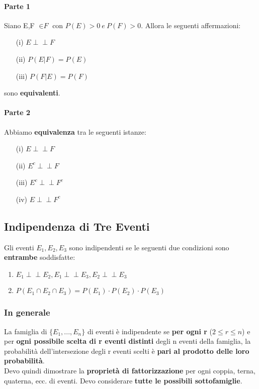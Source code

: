 \documentclass{report}
\newcommand{\indep}{\perp \!\!\! \perp}
\begin{document}
\paragraph{Parte 1}Siano E,F \(\in \textit{F}\) con \(P(E) > 0\ e\ P(F) > 0\). Allora le seguenti affermazioni:
    \begin{itemize}
        \item [(i)] \(E \indep F\)
        \item [(ii)] \(P(E|F) = P(E)\)
        \item [(iii)] \(P(F|E) = P(F)\)
    \end{itemize}
    sono \textbf{equivalenti}.
\paragraph{Parte 2}
Abbiamo \textbf{equivalenza} tra le seguenti istanze:
\begin{itemize}
    \item [(i)] \(E \indep F\)
    \item [(ii)] \(E^c \indep F\)
    \item [(iii)] \(E^c \indep F^c\)
    \item [(iv)] \(E \indep F^c\)
\end{itemize}
\subsection{Indipendenza di Tre Eventi}
Gli eventi \(E_1, E_2, E_3\) sono indipendenti se le seguenti due condizioni sono \textbf{entrambe} soddisfatte: \begin{enumerate}
    \item \(E_1 \indep E_2, E_1 \indep E_3, E_2 \indep E_3\)
    \item \(P(E_1 \cap E_2 \cap E_3) = P(E_1)\cdot P(E_2) \cdot P(E_3)\)
\end{enumerate}
\subsubsection{In generale}
La famiglia di \(\{E_1,...,E_n\}\) di eventi è indipendente se \textbf{per ogni r} (\(2 \leq r \leq n\)) e per \textbf{ogni possibile scelta di r eventi distinti} degli n eventi della famiglia, la probabilità dell'intersezione degli r eventi scelti è \textbf{pari al prodotto delle loro probabilità}.\\
Devo quindi dimostrare la \textbf{proprietà di fattorizzazione} per ogni coppia, terna, quaterna, ecc. di eventi. Devo considerare \textbf{tutte le possibili sottofamiglie}.
\end{document}

